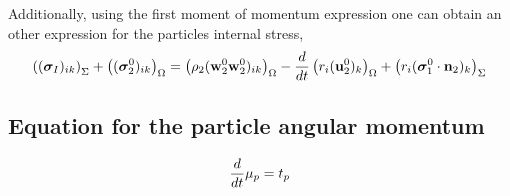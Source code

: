 Additionally, using the first moment of momentum expression one can obtain an other expression for the particles internal stress, 
\begin{equation}
    \left(  (\bm{\sigma}_I)_{ik} \right)_\Sigma
    +\left(  (\bm{\sigma}_2^0)_{ik} \right)_\Omega
    = 
    \left(  \rho_2 
    (\textbf{w}_2^0\textbf{w}_2^0  )_{ik}
     \right)_\Omega
    -\frac{d}{d t} \left(  r_i (\textbf{u}^0_2)_k  \right)_\Omega
    +\left(  
     r_i (\bm{\sigma}_1^0 \cdot \textbf{n}_2)_{k}
     \right)_\Sigma
\end{equation}
\subsection{Equation for the particle angular momentum}
\begin{equation*}
    \frac{d}{d t} \mu_p = t_p
\end{equation*}